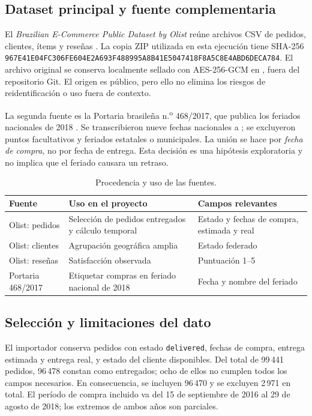 \documentclass[12pt,a4paper]{article}
\begin{document}
\subsection{Dataset principal y fuente complementaria}
El \emph{Brazilian E-Commerce Public Dataset by Olist} reúne archivos CSV de pedidos, clientes, ítems y reseñas \cite{olist}. La copia ZIP utilizada en esta ejecución tiene SHA-256 \texttt{967E41E04FC306FE604E2A693F488995A8B41E5047418F8A5C8E4ABD6DECA784}. El archivo original se conserva localmente sellado con AES-256-GCM en , fuera del repositorio Git. El origen es público, pero ello no elimina los riesgos de reidentificación o uso fuera de contexto.

La segunda fuente es la Portaria brasileña n.\textsuperscript{o} 468/2017, que publica los feriados nacionales de 2018 \cite{feriados}. Se transcribieron nueve fechas nacionales a ; se excluyeron puntos facultativos y feriados estatales o municipales. La unión se hace por \emph{fecha de compra}, no por fecha de entrega. Esta decisión es una hipótesis exploratoria y no implica que el feriado causara un retraso.

\begin{table}[H]
\centering\small
\begin{tabularx}{\textwidth}{P{3.6cm}Y P{3.2cm}}
\toprule
Fuente & Uso en el proyecto & Campos relevantes\\
\midrule
Olist: pedidos & Selección de pedidos entregados y cálculo temporal & Estado y fechas de compra, estimada y real\\
Olist: clientes & Agrupación geográfica amplia & Estado federado\\
Olist: reseñas & Satisfacción observada & Puntuación 1--5\\
Portaria 468/2017 & Etiquetar compras en feriado nacional de 2018 & Fecha y nombre del feriado\\
\bottomrule
\end{tabularx}
\caption{Procedencia y uso de las fuentes.}
\end{table}

\subsection{Selección y limitaciones del dato}
El importador conserva pedidos con estado \texttt{delivered}, fechas de compra, entrega estimada y entrega real, y estado del cliente disponibles. Del total de 99\,441 pedidos, 96\,478 constan como entregados; ocho de ellos no cumplen todos los campos necesarios. En consecuencia, se incluyen 96\,470 y se excluyen 2\,971 en total. El período de compra incluido va del 15 de septiembre de 2016 al 29 de agosto de 2018; los extremos de ambos años son parciales.
\end{document}
